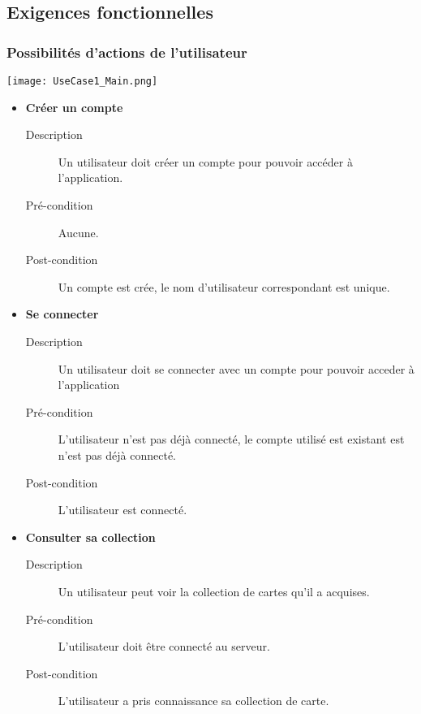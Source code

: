 \documentclass{article}
\begin{document}
	\subsection{Exigences fonctionnelles}
		\subsubsection{Possibilités d'actions de l'utilisateur}
			\begin{center}\texttt{[image: UseCase1\_Main.png]}\end{center}
			\begin{itemize}
				\item \textbf{Créer un compte}
				\begin{description}
					\item[Description] Un utilisateur doit créer un compte pour pouvoir accéder à l'application.
					\item[Pré-condition] Aucune.
					\item[Post-condition] Un compte est crée, le nom d'utilisateur correspondant est unique.\\
				\end{description}

				\item \textbf{Se connecter}
				\begin{description}
					\item[Description] Un utilisateur doit se connecter avec un compte pour pouvoir acceder à l'application
					\item[Pré-condition] L'utilisateur n'est pas déjà connecté, le compte utilisé est existant est n'est pas déjà connecté.
					\item[Post-condition] L'utilisateur est connecté.\\
				\end{description}

				\item \textbf{Consulter sa collection}
				\begin{description}
					\item[Description] Un utilisateur peut voir la collection de cartes qu'il a acquises.
					\item[Pré-condition] L'utilisateur doit être connecté au serveur.
					\item[Post-condition] L'utilisateur a pris connaissance sa collection de carte.\\
				\end{description}


\end{itemize}
\end{document}
